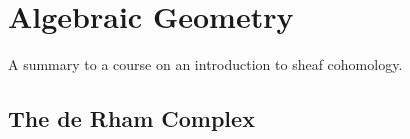 \chapter{Algebraic Geometry}
A summary to a course on an introduction to sheaf cohomology.

\section{The de Rham Complex}


